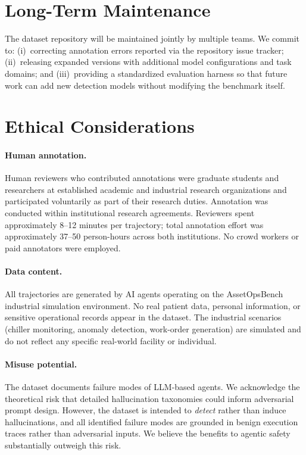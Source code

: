 \documentclass{article}
\begin{document}
\section*{Long-Term Maintenance}
\label{sec:maintenance}

The dataset repository will be maintained jointly by multiple teams. We commit to: (i)~correcting annotation errors reported via the repository issue tracker; (ii)~releasing expanded versions with additional model configurations and task domains; and (iii)~providing a standardized evaluation harness so that future work can add new detection models without modifying the benchmark itself.

\section*{Ethical Considerations}
\label{sec:ethics}

\paragraph{Human annotation.}
Human reviewers who contributed annotations were graduate students and researchers at established academic and industrial research organizations and participated voluntarily as part of their research duties. Annotation was conducted within institutional research agreements. Reviewers spent approximately 8--12 minutes per trajectory; total annotation effort was approximately 37--50 person-hours across both institutions. No crowd workers or paid annotators were employed.

\paragraph{Data content.}
All trajectories are generated by AI agents operating on the AssetOpsBench industrial simulation environment. No real patient data, personal information, or sensitive operational records appear in the dataset. The industrial scenarios (chiller monitoring, anomaly detection, work-order generation) are simulated and do not reflect any specific real-world facility or individual.

\paragraph{Misuse potential.}
The dataset documents failure modes of LLM-based agents. We acknowledge the theoretical risk that detailed hallucination taxonomies could inform adversarial prompt design. However, the dataset is intended to \emph{detect} rather than induce hallucinations, and all identified failure modes are grounded in benign execution traces rather than adversarial inputs. We believe the benefits to agentic safety substantially outweigh this risk.
\end{document}
